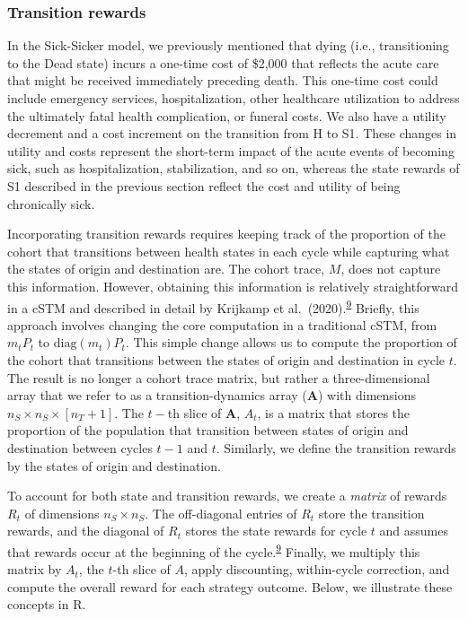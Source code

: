 \documentclass[
]{article}
\begin{document}
\hypertarget{transition-rewards}{%
\subsubsection{Transition rewards}\label{transition-rewards}}

In the Sick-Sicker model, we previously mentioned that dying (i.e., transitioning to the Dead state) incurs a one-time cost of \$2,000 that reflects the acute care that might be received immediately preceding death. This one-time cost could include emergency services, hospitalization, other healthcare utilization to address the ultimately fatal health complication, or funeral costs. We also have a utility decrement and a cost increment on the transition from H to S1. These changes in utility and costs represent the short-term impact of the acute events of becoming sick, such as hospitalization, stabilization, and so on, whereas the state rewards of S1 described in the previous section reflect the cost and utility of being chronically sick.

Incorporating transition rewards requires keeping track of the proportion of the cohort that transitions between health states in each cycle while capturing what the states of origin and destination are. The cohort trace, \(M\), does not capture this information. However, obtaining this information is relatively straightforward in a cSTM and described in detail by Krijkamp et al.~(2020).\textsuperscript{\protect\hyperlink{ref-Krijkamp2019}{9}} Briefly, this approach involves changing the core computation in a traditional cSTM, from \(m_t P_t\) to \(\text{diag}(m_t) P_t\). This simple change allows us to compute the proportion of the cohort that transitions between the states of origin and destination in cycle \(t\). The result is no longer a cohort trace matrix, but rather a three-dimensional array that we refer to as a transition-dynamics array (\(\mathbf{A}\)) with dimensions \(n_S \times n_S \times [n_T+1]\). The \(t-\)th slice of \(\mathbf{A}\), \(A_t\), is a matrix that stores the proportion of the population that transition between states of origin and destination between cycles \(t-1\) and \(t\). Similarly, we define the transition rewards by the states of origin and destination.

To account for both state and transition rewards, we create a \emph{matrix} of rewards \(R_t\) of dimensions \(n_S \times n_S\). The off-diagonal entries of \(R_t\) store the transition rewards, and the diagonal of \(R_t\) stores the state rewards for cycle \(t\) and assumes that rewards occur at the beginning of the cycle.\textsuperscript{\protect\hyperlink{ref-Krijkamp2019}{9}} Finally, we multiply this matrix by \(A_t\), the \(t\)-th slice of \(A\), apply discounting, within-cycle correction, and compute the overall reward for each strategy outcome. Below, we illustrate these concepts in R.
\end{document}
